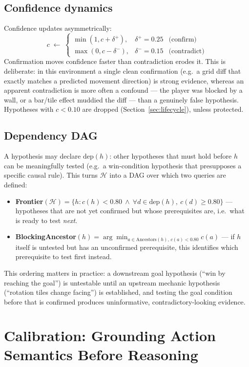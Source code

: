 \documentclass{article}
\newcommand{\Hyp}{\mathcal{H}}
\newcommand{\Dep}{\mathrm{dep}}
\begin{document}
\subsection{Confidence dynamics}
Confidence updates asymmetrically:
\[
c \;\leftarrow\;
\begin{cases}
\min(1, c + \delta^+), & \delta^+ = 0.25 & \text{(confirm)}\\
\max(0, c - \delta^-), & \delta^- = 0.15 & \text{(contradict)}
\end{cases}
\]
Confirmation moves confidence faster than contradiction erodes it. This
is deliberate: in this environment a single clean confirmation (e.g.\ a
grid diff that exactly matches a predicted movement direction) is
strong evidence, whereas an apparent contradiction is more often a
confound — the player was blocked by a wall, or a bar/tile effect
muddied the diff — than a genuinely false hypothesis. Hypotheses with
$c < 0.10$ are dropped (Section~\ref{sec:lifecycle}), unless protected.

\subsection{Dependency DAG}
A hypothesis may declare $\Dep(h)$: other hypotheses that must hold
before $h$ can be meaningfully tested (e.g.\ a win-condition hypothesis
that presupposes a specific causal rule). This turns $\Hyp$ into a DAG
over which two queries are defined:

\begin{itemize}[nosep]
\item \textbf{Frontier}$(\Hyp) = \{h : c(h) < 0.80 \ \wedge\ \forall d \in \Dep(h),\ c(d) \ge 0.80\}$ — hypotheses that are not yet confirmed but whose prerequisites are, i.e.\ what is ready to test \emph{next}.
\item \textbf{BlockingAncestor}$(h) = \arg\min_{a \in \mathrm{Ancestors}(h),\, c(a)<0.80} c(a)$ — if $h$ itself is untested but has an unconfirmed prerequisite, this identifies which prerequisite to test first instead.
\end{itemize}

This ordering matters in practice: a downstream goal hypothesis (``win
by reaching the goal'') is untestable until an upstream mechanic
hypothesis (``rotation tiles change facing'') is established, and
testing the goal condition before that is confirmed produces
uninformative, contradictory-looking evidence.

\section{Calibration: Grounding Action Semantics Before Reasoning}
\label{sec:calibration}
\end{document}
